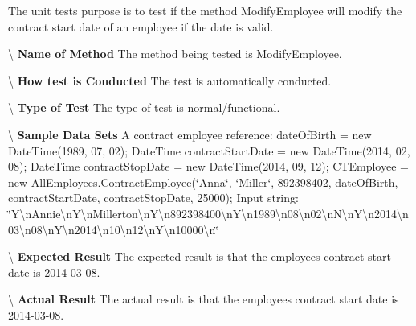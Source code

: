 The unit test\textquotesingle{}s purpose is to test if the method Modify\+Employee will modify the contract start date of an employee if the date is valid. 

\textbackslash{} {\bfseries  Name of Method} The method being tested is Modify\+Employee.

\textbackslash{} {\bfseries  How test is Conducted} The test is automatically conducted.

\textbackslash{} {\bfseries  Type of Test} The type of test is normal/functional.

\textbackslash{} {\bfseries  Sample Data Sets} A contract employee reference\+: date\+Of\+Birth = new Date\+Time(1989, 07, 02); Date\+Time contract\+Start\+Date = new Date\+Time(2014, 02, 08); Date\+Time contract\+Stop\+Date = new Date\+Time(2014, 09, 12); C\+T\+Employee = new \hyperlink{class_all_employees_1_1_contract_employee}{All\+Employees.\+Contract\+Employee}(\char`\"{}\+Anna\char`\"{}, \char`\"{}\+Miller\char`\"{}, 892398402, date\+Of\+Birth, contract\+Start\+Date, contract\+Stop\+Date, 25000); Input string\+: \char`\"{}\+Y\textbackslash{}n\+Annie\textbackslash{}n\+Y\textbackslash{}n\+Millerton\textbackslash{}n\+Y\textbackslash{}n892398400\textbackslash{}n\+Y\textbackslash{}n1989\textbackslash{}n08\textbackslash{}n02\textbackslash{}n\+N\textbackslash{}n\+Y\textbackslash{}n2014\textbackslash{}n03\textbackslash{}n08\textbackslash{}n\+Y\textbackslash{}n2014\textbackslash{}n10\textbackslash{}n12\textbackslash{}n\+Y\textbackslash{}n10000\textbackslash{}n\char`\"{}

\textbackslash{} {\bfseries  Expected Result} The expected result is that the employee\textquotesingle{}s contract start date is 2014-\/03-\/08.

\textbackslash{} {\bfseries  Actual Result} The actual result is that the employee\textquotesingle{}s contract start date is 2014-\/03-\/08. \hypertarget{class_the_company_1_1_tests_1_1_modify_employee_tests_ad6e8eaf73cd1ed44d4c49f8253033283}{}
